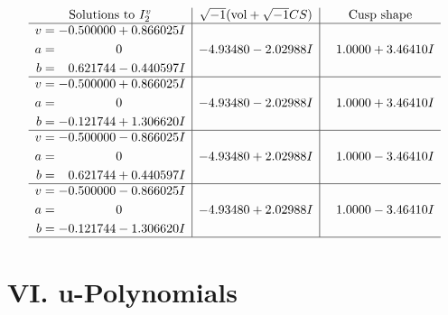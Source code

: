 \documentclass[1p]{elsarticle_modified}
\theoremstyle{definition}
\newcommand{\I}{\sqrt{-1}}
\begin{document}
$$\begin{array}{c|c|c}  
\text{Solutions to }I^v_{2}& \I (\text{vol} + \sqrt{-1}CS) & \text{Cusp shape}\\
 \hline 
\begin{aligned}
v &= -0.500000 + 0.866025 I \\
a &= \phantom{-0.000000 } 0 \\
b &= \phantom{-}0.621744 - 0.440597 I\end{aligned}
 & -4.93480 - 2.02988 I & \phantom{-}1.0000 + 3.46410 I \\ \hline\begin{aligned}
v &= -0.500000 + 0.866025 I \\
a &= \phantom{-0.000000 } 0 \\
b &= -0.121744 + 1.306620 I\end{aligned}
 & -4.93480 - 2.02988 I & \phantom{-}1.0000 + 3.46410 I \\ \hline\begin{aligned}
v &= -0.500000 - 0.866025 I \\
a &= \phantom{-0.000000 } 0 \\
b &= \phantom{-}0.621744 + 0.440597 I\end{aligned}
 & -4.93480 + 2.02988 I & \phantom{-}1.0000 - 3.46410 I \\ \hline\begin{aligned}
v &= -0.500000 - 0.866025 I \\
a &= \phantom{-0.000000 } 0 \\
b &= -0.121744 - 1.306620 I\end{aligned}
 & -4.93480 + 2.02988 I & \phantom{-}1.0000 - 3.46410 I\\
 \hline 
 \end{array}$$\newpage
\newpage\renewcommand{\arraystretch}{1}
\centering \section*{ VI. u-Polynomials}
\end{document}

